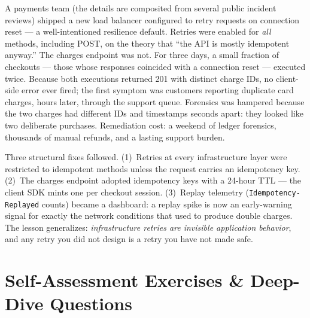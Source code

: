 A payments team (the details are composited from several public incident
reviews) shipped a new load balancer configured to retry requests on
connection reset --- a well-intentioned resilience default. Retries were
enabled for \emph{all} methods, including POST, on the theory that ``the
API is mostly idempotent anyway.'' The charges endpoint was not. For three
days, a small fraction of checkouts --- those whose responses coincided
with a connection reset --- executed twice. Because both executions
returned 201 with distinct charge IDs, no client-side error ever fired; the
first symptom was customers reporting duplicate card charges, hours later,
through the support queue. Forensics was hampered because the two charges
had different IDs and timestamps seconds apart: they looked like two
deliberate purchases. Remediation cost: a weekend of ledger forensics,
thousands of manual refunds, and a lasting support burden.

Three structural fixes followed. (1)~Retries at every infrastructure layer
were restricted to idempotent methods unless the request carries an
idempotency key. (2)~The charges endpoint adopted idempotency keys with a
24-hour TTL --- the client SDK mints one per checkout session. (3)~Replay
telemetry (\texttt{Idempotency-Replayed} counts) became a dashboard: a
replay spike is now an early-warning signal for exactly the network
conditions that used to produce double charges. The lesson generalizes:
\emph{infrastructure retries are invisible application behavior}, and any
retry you did not design is a retry you have not made safe.

\section{Self-Assessment Exercises \& Deep-Dive Questions}
\label{sec:ch10-exercises}

